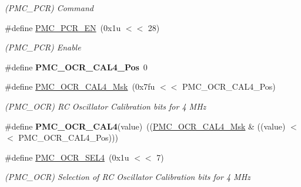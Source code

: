 \begin{DoxyCompactItemize}
\begin{DoxyCompactList}\small\item\em (P\+M\+C\+\_\+\+P\+CR) Command \end{DoxyCompactList}\item 
\mbox{\label{group__SAMS70__PMC_gaad56a2b89ddb060b1438188ededa22f6}} 
\#define \mbox{\hyperlink{group__SAMS70__PMC_gaad56a2b89ddb060b1438188ededa22f6}{P\+M\+C\+\_\+\+P\+C\+R\+\_\+\+EN}}~(0x1u $<$$<$ 28)
\begin{DoxyCompactList}\small\item\em (P\+M\+C\+\_\+\+P\+CR) Enable \end{DoxyCompactList}\item 
\mbox{\label{group__SAMS70__PMC_gaeb0974986596374c76e849079b3d55d2}} 
\#define {\bfseries P\+M\+C\+\_\+\+O\+C\+R\+\_\+\+C\+A\+L4\+\_\+\+Pos}~0
\item 
\mbox{\label{group__SAMS70__PMC_ga235fcd9ef2280ab09e882e6feab2fcb4}} 
\#define \mbox{\hyperlink{group__SAMS70__PMC_ga235fcd9ef2280ab09e882e6feab2fcb4}{P\+M\+C\+\_\+\+O\+C\+R\+\_\+\+C\+A\+L4\+\_\+\+Msk}}~(0x7fu $<$$<$ P\+M\+C\+\_\+\+O\+C\+R\+\_\+\+C\+A\+L4\+\_\+\+Pos)
\begin{DoxyCompactList}\small\item\em (P\+M\+C\+\_\+\+O\+CR) RC Oscillator Calibration bits for 4 M\+Hz \end{DoxyCompactList}\item 
\mbox{\label{group__SAMS70__PMC_gade8c1c8e3ba9b7608a2f284d754883b2}} 
\#define {\bfseries P\+M\+C\+\_\+\+O\+C\+R\+\_\+\+C\+A\+L4}(value)~((\mbox{\hyperlink{group__SAMV71__PMC_ga235fcd9ef2280ab09e882e6feab2fcb4}{P\+M\+C\+\_\+\+O\+C\+R\+\_\+\+C\+A\+L4\+\_\+\+Msk}} \& ((value) $<$$<$ P\+M\+C\+\_\+\+O\+C\+R\+\_\+\+C\+A\+L4\+\_\+\+Pos)))
\item 
\mbox{\label{group__SAMS70__PMC_ga66f57c76dd065ade034713e42feb7f66}} 
\#define \mbox{\hyperlink{group__SAMS70__PMC_ga66f57c76dd065ade034713e42feb7f66}{P\+M\+C\+\_\+\+O\+C\+R\+\_\+\+S\+E\+L4}}~(0x1u $<$$<$ 7)
\begin{DoxyCompactList}\small\item\em (P\+M\+C\+\_\+\+O\+CR) Selection of RC Oscillator Calibration bits for 4 M\+Hz \end{DoxyCompactList}\item 

\end{DoxyCompactItemize}
